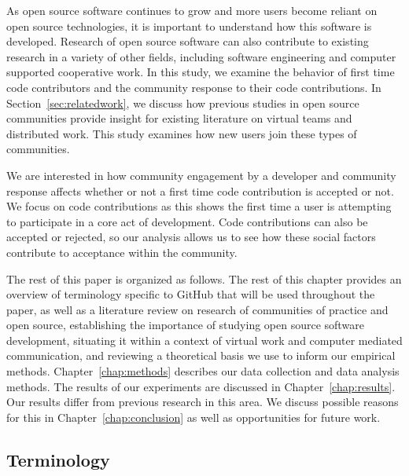 \documentclass{sigchi}
\begin{document}
As open source software continues to grow and more users become reliant on open
source technologies, it is important to understand how this software is
developed. Research of open source software can also contribute to existing
research in a variety of other fields, including software engineering and computer
supported cooperative work. In this study, we examine the behavior of first time
code contributors and the community response to their code contributions. In
Section~\ref{sec:relatedwork}, we discuss how previous studies in open source
communities provide insight for existing literature on virtual teams and
distributed work. This study examines how new users join these types of
communities.

We are interested in how community engagement by a developer and community
response affects whether or not a first time code contribution is accepted or
not. We focus on code contributions as this shows the first time a user is
attempting to participate in a core act of development. Code contributions can
also be accepted or rejected, so our analysis allows us to see how these
social factors contribute to acceptance within the community.

The rest of this paper is organized as follows. The rest of this chapter
provides an overview of terminology specific to GitHub that will be used
throughout the paper, as well as  a literature review on research of communities
of practice and open source, establishing the importance of studying open source
software development, situating it within a context of virtual work and computer
mediated communication, and reviewing a theoretical basis we use to inform our
empirical methods. Chapter~\ref{chap:methods} describes our data collection and
data analysis methods. The results of our experiments are discussed in
Chapter~\ref{chap:results}. Our results differ from previous research in this
area. We discuss possible reasons for this in Chapter~\ref{chap:conclusion} as
well as opportunities for future work.


\subsection{Terminology} \label{sec:terms}
\end{document}
